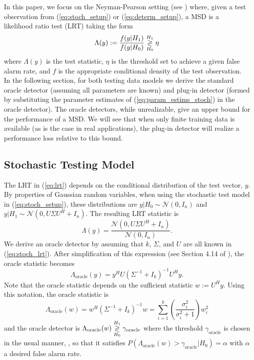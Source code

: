 In this paper, we focus on the  Neyman-Pearson setting (see \cite{van1968detection}) where, given a test observation from (\ref{eq:stoch_setup}) or (\ref{eq:determ_setup}), a MSD is a likelihood ratio test (LRT) taking the form
\begin{equation}\label{eq:lrt}
\Lambda(y):=\dfrac{f(y|H_1)}{f(y|H_0)} \detgtrless \eta
\end{equation}
where $\Lambda(y)$ is the test statistic, $\eta$ is the threshold set to achieve a given false alarm rate, and $f$ is the appropriate conditional density of the test observation. In the following section, for both testing data models we derive the standard oracle detector (assuming all parameters are known) and plug-in detector (formed by substituting the parameter estimates of (\ref{eq:param_estims_stoch}) in the oracle detector). The oracle detectors, while unrealizable, give an upper bound for the performance of a MSD. We will see that when only finite training data is available (as is the case in real applications), the plug-in detector will realize a performance loss relative to this bound.

\subsection{Stochastic Testing Model}\label{sec:plugin_stoch}
The LRT in (\ref{eq:lrt}) depends on the conditional distribution of the test vector, $y$. By properties of Gaussian random variables, when using the stochastic test model in (\ref{eq:stoch_setup}), these distributions are $y|H_0\sim\mathcal{N}\left(0,I_n\right)$ and $y|H_1\sim\mathcal{N}\left(0, U\Sigma U^H +I_n\right)$. The resulting LRT statistic is
\begin{equation}\label{eq:stoch_lrt}
\Lambda(y)=\frac{\mathcal{N}(0,U\Sigma U^H + I_n)}{\mathcal{N}(0,I_n)}.
\end{equation}
We derive an oracle detector by assuming that $k$, $\Sigma$, and $U$ are all known in (\ref{eq:stoch_lrt}). After simplification of this expression (see Section 4.14 of \cite{scharf1991statistical}), the oracle statistic becomes
\begin{equation}\label{eq:oracle_stat_stoch_y}
\Lambda_{\text{oracle}}(y) = y^HU\left(\Sigma^{-1}+I_k\right)^{-1}U^Hy.
\end{equation}
Note that the oracle statistic depends on the sufficient statistic $w:=U^Hy$. Using this notation, the oracle statistic is
\begin{equation}\label{eq:oracle_stat_stoch_w}
\boxed{\Lambda_{\text{oracle}}(w) = w^H\left(\Sigma^{-1}+I_k\right)^{-1}w = \sum_{i=1}^k\left(\frac{\sigma_i^2}{\sigma_i^2+1}\right)w_i^2}
\end{equation}
and the oracle detector is $\Lambda_{\text{oracle}}(w) \overset{H_1}{\underset{H_0}{\gtrless}} \gamma_{\text{oracle}}$
where the threshold $\gamma_{\text{oracle}}$ is chosen in the usual manner, \ie, so that it satisfies $P(\Lambda_{\text{oracle}}(w)>\gamma_{\text{oracle}}|H_0)=\alpha$ with $\alpha$ a desired false alarm rate.


